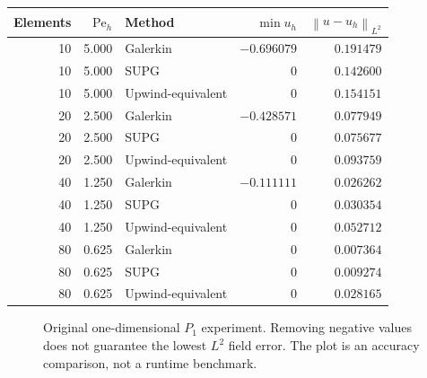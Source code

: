 \documentclass[11pt,a4paper]{article}
\newcommand{\norm}[1]{\left\lVert #1\right\rVert}
\begin{document}
\begin{center}
\small
\begin{tabular}{rrlrr}
\toprule
Elements & $\mathrm{Pe}_h$ & Method & $\min u_h$ & $\norm{u-u_h}_{L^2}$\\
\midrule
10 & 5.000 & Galerkin & $-0.696079$ & $0.191479$\\
10 & 5.000 & SUPG & $0$ & $0.142600$\\
10 & 5.000 & Upwind-equivalent & $0$ & $0.154151$\\
20 & 2.500 & Galerkin & $-0.428571$ & $0.077949$\\
20 & 2.500 & SUPG & $0$ & $0.075677$\\
20 & 2.500 & Upwind-equivalent & $0$ & $0.093759$\\
40 & 1.250 & Galerkin & $-0.111111$ & $0.026262$\\
40 & 1.250 & SUPG & $0$ & $0.030354$\\
40 & 1.250 & Upwind-equivalent & $0$ & $0.052712$\\
80 & 0.625 & Galerkin & $0$ & $0.007364$\\
80 & 0.625 & SUPG & $0$ & $0.009274$\\
80 & 0.625 & Upwind-equivalent & $0$ & $0.028165$\\
\bottomrule
\end{tabular}
\end{center}

\begin{figure}[htbp]
\centering
{}
\caption{Original one-dimensional $P_1$ experiment. Removing negative values does not guarantee the lowest $L^2$ field error. The plot is an accuracy comparison, not a runtime benchmark.}
\end{figure}
\end{document}
